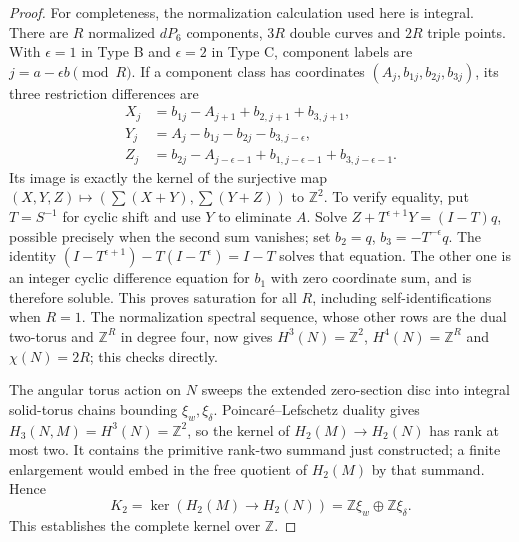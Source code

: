 \begin{proof}
For completeness, the normalization calculation used here is
integral. There are $R$ normalized $dP_6$ components, $3R$ double
curves and $2R$ triple points. With $\epsilon=1$ in Type B and
$\epsilon=2$ in Type C, component labels are
$j=a-\epsilon b\pmod R$. If a component class has coordinates
$(A_j,b_{1j},b_{2j},b_{3j})$, its three restriction differences are
\[
 \begin{split}
 X_j&=b_{1j}-A_{j+1}+b_{2,j+1}+b_{3,j+1},\\
 Y_j&=A_j-b_{1j}-b_{2j}-b_{3,j-\epsilon},\\
 Z_j&=b_{2j}-A_{j-\epsilon-1}
                  +b_{1,j-\epsilon-1}+b_{3,j-\epsilon-1}.
 \end{split}
\]
Its image is exactly the kernel of the surjective map
$(X,Y,Z)\mapsto(\sum(X+Y),\sum(Y+Z))$ to $\mathbb Z^2$.
To verify equality, put $T=S^{-1}$ for cyclic shift and use $Y$
to eliminate $A$. Solve
$Z+T^{\epsilon+1}Y=(I-T)q$, possible precisely when the second
sum vanishes; set $b_2=q$, $b_3=-T^{-\epsilon}q$.
The identity
$(I-T^{\epsilon+1})-T(I-T^\epsilon)=I-T$ solves that equation.
The other one is an integer cyclic difference equation for $b_1$
with zero coordinate sum, and is therefore soluble.
This proves saturation for all $R$, including self-identifications
when $R=1$. The normalization spectral sequence, whose other
rows are the dual two-torus and $\mathbb Z^R$ in degree four,
now gives $H^3(N)=\mathbb Z^2$, $H^4(N)=\mathbb Z^R$ and
$\chi(N)=2R$; this checks \cite[Theorem 7.8]{manYang26} directly.

The angular torus action on $N$ sweeps the extended zero-section
disc into integral solid-torus chains bounding $\xi_w,\xi_\delta$.
Poincar\'e--Lefschetz duality gives
$H_3(N,M)=H^3(N)=\mathbb Z^2$, so the kernel of
$H_2(M)\to H_2(N)$ has rank at most two. It contains the primitive
rank-two summand just constructed; a finite enlargement would
embed in the free quotient of $H_2(M)$ by that summand.
Hence
\[
 K_2=\ker(H_2(M)\to H_2(N))
       =\mathbb Z\xi_w\oplus\mathbb Z\xi_\delta.
\]
This establishes the complete kernel over $\mathbb Z$.


\end{proof}
